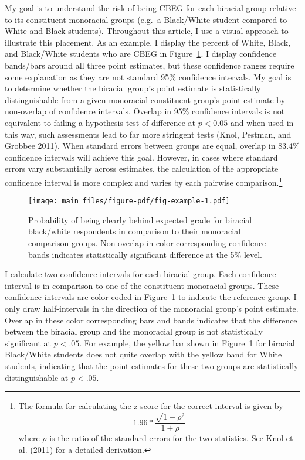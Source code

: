 \documentclass[
  letterpaper,
  DIV=11,
  numbers=noendperiod]{scrartcl}
\begin{document}
My goal is to understand the risk of being CBEG for each biracial group
relative to its constituent monoracial groups (e.g.~a Black/White
student compared to White and Black students). Throughout this article,
I use a visual approach to illustrate this placement. As an example, I
display the percent of White, Black, and Black/White students who are
CBEG in Figure~\ref{fig-example}. I display confidence bands/bars around
all three point estimates, but these confidence ranges require some
explanation as they are not standard 95\% confidence intervals. My goal
is to determine whether the biracial group's point estimate is
statistically distinguishable from a given monoracial constituent
group's point estimate by non-overlap of confidence intervals. Overlap
in 95\% confidence intervals is not equivalent to failing a hypothesis
test of difference at \(p<0.05\) and when used in this way, such
assessments lead to far more stringent tests (Knol, Pestman, and Grobbee
2011). When standard errors between groups are equal, overlap in 83.4\%
confidence intervals will achieve this goal. However, in cases where
standard errors vary substantially across estimates, the calculation of
the appropriate confidence interval is more complex and varies by each
pairwise comparison.\footnote{The formula for calculating the z-score
  for the correct interval is given by
  \[1.96 * \frac{\sqrt{1+\rho^2}}{1+\rho}\] where \(\rho\) is the ratio
  of the standard errors for the two statistics. See Knol et al. (2011)
  for a detailed derivation.}

\begin{figure}[t]

{\centering \texttt{[image: main\_files/figure-pdf/fig-example-1.pdf]}

}

\caption{\label{fig-example}Probability of being clearly behind expected
grade for biracial black/white respondents in comparison to their
monoracial comparison groups. Non-overlap in color corresponding
confidence bands indicates statistically significant difference at the
5\% level.}

\end{figure}

I calculate two confidence intervals for each biracial group. Each
confidence interval is in comparison to one of the constituent
monoracial groups. These confidence intervals are color-coded in
Figure~\ref{fig-example} to indicate the reference group. I only draw
half-intervals in the direction of the monoracial group's point
estimate. Overlap in these color corresponding bars and bands indicates
that the difference between the biracial group and the monoracial group
is not statistically significant at \(p<.05\). For example, the yellow
bar shown in Figure~\ref{fig-example} for biracial Black/White students
does not quite overlap with the yellow band for White students,
indicating that the point estimates for these two groups are
statistically distinguishable at \(p<.05\).
\end{document}
